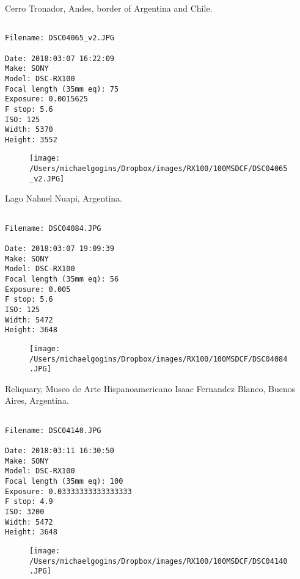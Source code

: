 \clearpage
\onecolumn
\noindent Cerro Tronador, Andes, border of Argentina and Chile.
\noindent
\begin{lstlisting}

Filename: DSC04065_v2.JPG

Date: 2018:03:07 16:22:09
Make: SONY
Model: DSC-RX100
Focal length (35mm eq): 75
Exposure: 0.0015625
F stop: 5.6
ISO: 125
Width: 5370
Height: 3552
\end{lstlisting}
\clearpage

\begin{figure}
\texttt{[image: /Users/michaelgogins/Dropbox/images/RX100/100MSDCF/DSC04065\_v2.JPG]}
\end{figure}
    
\clearpage
\onecolumn
\noindent Lago Nahuel Nuapi, Argentina.
\noindent
\begin{lstlisting}

Filename: DSC04084.JPG

Date: 2018:03:07 19:09:39
Make: SONY
Model: DSC-RX100
Focal length (35mm eq): 56
Exposure: 0.005
F stop: 5.6
ISO: 125
Width: 5472
Height: 3648
\end{lstlisting}
\clearpage

\begin{figure}
\texttt{[image: /Users/michaelgogins/Dropbox/images/RX100/100MSDCF/DSC04084.JPG]}
\end{figure}
    
\clearpage
\onecolumn
\noindent Reliquary, Museo de Arte Hispanoamericano Isaac Fernandez Blanco, Buenos Aires, Argentina.
\noindent
\begin{lstlisting}

Filename: DSC04140.JPG

Date: 2018:03:11 16:30:50
Make: SONY
Model: DSC-RX100
Focal length (35mm eq): 100
Exposure: 0.03333333333333333
F stop: 4.9
ISO: 3200
Width: 5472
Height: 3648
\end{lstlisting}
\clearpage

\begin{figure}
\texttt{[image: /Users/michaelgogins/Dropbox/images/RX100/100MSDCF/DSC04140.JPG]}
\end{figure}
    
